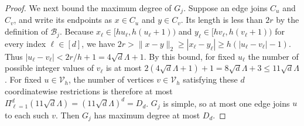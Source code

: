 \documentclass[letterpaper,12pt]{article}
\theoremstyle{definition}
\numberwithin{equation}{section}
\begin{document}
\begin{proof}
We next bound the maximum degree of $G_j$.
Suppose an edge joins $C_u$ and $C_v$, and write its endpoints as $x\in C_u$ and $y\in C_v$.
Its length is less than $2r$ by the definition of $\mathcal B_j$.
Because $x_\ell\in[hu_\ell,h(u_\ell+1))$ and $y_\ell\in[hv_\ell,h(v_\ell+1))$ for every index $\ell\in[d]$, we have $2r>\|x-y\|_2\geq|x_\ell-y_\ell|\geq h(|u_\ell-v_\ell|-1)$.
Thus $|u_\ell-v_\ell|<2r/h+1=4\sqrt d\Lambda+1$.
By this bound, for fixed $u_\ell$ the number of possible integer values of $v_\ell$ is at most $2(4\sqrt d\Lambda+1)+1=8\sqrt d\Lambda+3\leq11\sqrt d\Lambda$.
For fixed $u\in\mathcal V_h$, the number of vertices $v\in\mathcal V_h$ satisfying these $d$ coordinatewise restrictions is therefore at most $\Pi_{\ell=1}^d(11\sqrt d\Lambda)=(11\sqrt d\Lambda)^d=D_d$.
$G_j$ is simple, so at most one edge joins $u$ to each such $v$.
Then $G_j$ has maximum degree at most $D_d$.


\end{proof}
\end{document}

